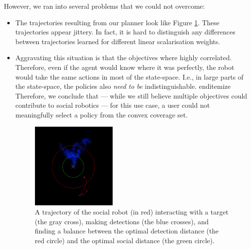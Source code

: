 \documentclass[a4paper,11pt]{report}
\begin{document}
However, we ran into several problems that we could not overcome: 
\begin{itemize}
\item The trajectories resulting from our planner look like Figure \ref{fig:motraj}. These trajectories appear jittery. In fact, it is hard to distinguish any differences between trajectories learned for different linear scalarisation weights. 
\item Aggravating this situation is that the objectives where highly correlated. Therefore, even if the agent would know where it was perfectly, the robot would take the same actions in most of the state-space. I.e., in large parts of the state-space, the policies also \emph{need to be} indistinguishable. 
end{itemize}
Therefore, we conclude that --- while we still believe multiple objectives could contribute to social robotics --- for this use case, a user could not meaningfully select a policy from the convex coverage set. 
\begin{figure}
\centering
\includegraphics[width=0.4\textwidth]{motrajectory.png}
\caption[Robot interaction trajectory]{A trajectory of the social robot (in red) interacting with a target (the gray 
cross), making detections (the blue crosses), and finding a balance between the optimal 
detection distance (the red circle) and the optimal social distance (the green circle).}
\label{fig:motraj}
\end{figure}
\end{itemize}
\end{document}

